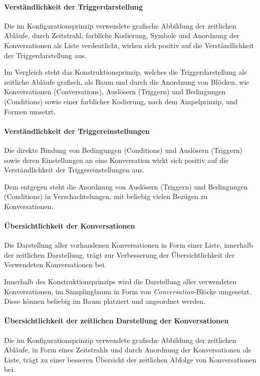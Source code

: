 \paragraph{Verständlichkeit der Triggerdarstellung}
Die im Konfigurationsprinzip verwendete grafische Abbildung der zeitlichen Abläufe, durch Zeitstrahl, farbliche Kodierung, Symbole und Anordnung der Konversationen als Liste verdeutlicht, wirken sich positiv auf die Verständlichkeit der Triggerdarstellung aus. 

Im Vergleich steht das Konstruktionsprinzip, welches die Triggerdarstellung als zeitliche Abläufe grafisch, als Baum und durch die Anordnung von Blöcken, wie Konversationen (Conversations), Auslösern (Triggern) und Bedingungen (Conditions) sowie einer farblicher Kodierung, nach dem Ampelprinzip, und Formen umsetzt.


\paragraph{Verständlichkeit der Triggereinstellungen}
Die direkte Bindung von Bedingungen (Conditions) und Auslösern (Triggern) sowie deren Einstellungen an eine Konversation wirkt sich positiv auf die Verständlichkeit der Triggereinstellungen aus. 

Dem entgegen steht die Anordnung von Auslösern (Triggern) und Bedingungen (Conditions) in Verschachtelungen, mit beliebig vielen Bezügen zu Konversationen.

\paragraph{Übersichtlichkeit der Konversationen}
Die Darstellung aller vorhandenen Konversationen in Form einer Liste, innerhalb der zeitlichen Darstellung, trägt zur Verbesserung der Übersichtlichkeit der Verwendeten Konversationen bei.

Innerhalb des Konstruktionsprinzips wird die Darstellung aller verwendeten Konversationen, im Samplingbaum in Form von \emph{Conversation}-Blöcke umgesetzt. Diese können beliebig im Baum platziert und angeordnet werden.

\paragraph{Übersichtlichkeit der zeitlichen Darstellung der Konversationen}
Die im Konfigurationsprinzip verwendete grafische Abbildung der zeitlichen Abläufe, in Form eines Zeitstrahls und durch Anordnung der Konversationen als Liste, trägt zu einer besseren Übersicht der zeitlichen Abfolge von Konversationen bei. 

